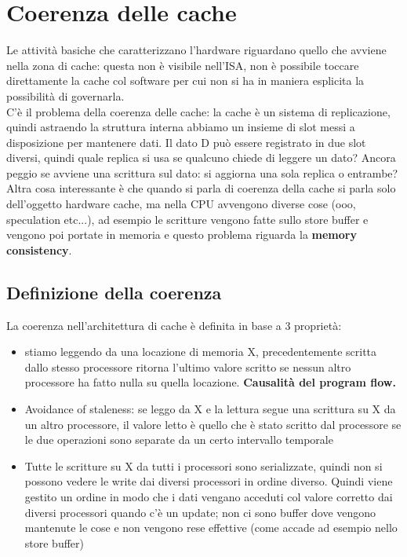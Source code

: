 \documentclass[14pt, oneside]{book}
\begin{document}
\section{Coerenza delle cache}
Le attività basiche che caratterizzano l'hardware riguardano quello che avviene nella zona di cache: questa non è visibile nell'ISA, non è possibile toccare direttamente la cache col software per cui non si ha in maniera esplicita la possibilità di governarla.\\ C'è il problema della coerenza delle cache: la cache è un sistema di replicazione, quindi astraendo la struttura interna abbiamo un insieme di slot messi a disposizione per mantenere dati. Il dato D può essere registrato in due slot diversi, quindi quale replica si usa se qualcuno chiede di leggere un dato? Ancora peggio se avviene una scrittura sul dato: si aggiorna una sola replica o entrambe? Altra cosa interessante è che quando si parla di coerenza della cache si parla solo dell'oggetto hardware cache, ma nella CPU avvengono diverse cose (ooo, speculation etc...), ad esempio le scritture vengono fatte sullo store buffer e vengono poi portate in memoria e questo problema riguarda la \textbf{memory consistency}.
\subsection{Definizione della coerenza}
La coerenza nell'architettura di cache è definita in base a 3 proprietà:
\begin{itemize}
\item stiamo leggendo da una locazione di memoria X, precedentemente scritta dallo stesso processore ritorna l'ultimo valore scritto se nessun altro processore ha fatto nulla su quella locazione. \textbf{Causalità del program flow.}
\item {Avoidance of staleness}: se leggo da X e la lettura segue una scrittura su X da un altro processore, il valore letto è quello che è stato scritto dal processore se le due operazioni sono separate da un certo intervallo temporale
\item Tutte le scritture su X da tutti i processori sono serializzate, quindi non si possono vedere le write dai diversi processori in ordine diverso. Quindi viene gestito un ordine in modo che i dati vengano acceduti col valore corretto dai diversi processori quando c'è un update; non ci sono buffer dove vengono mantenute le cose e non vengono rese effettive (come accade ad esempio nello store buffer)
\end{itemize}
\end{document}
